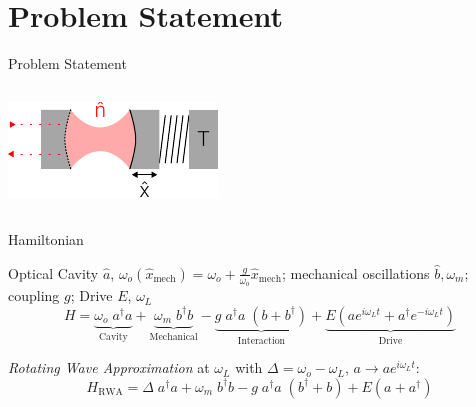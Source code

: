 \section{Problem Statement}
\begin{frame}{Problem Statement}
	\begin{columns}
		\includegraphics[width=\textwidth]{figures/drawing.pdf}

	\end{columns}

\end{frame}

\begin{frame}{Hamiltonian}

	{
		\small
		Optical Cavity $\hat a$, $\omega_o(\hat x_\text{mech}) = \omega_o + \frac{g}{\omega_o} \hat x_\text{mech}$;
		mechanical oscillations $\hat b, \omega_m$;
		coupling $g$;
		Drive $E$, $\omega_L$
	}
	$$
		H = \underbrace{
			\omega_o\; a^\dagger a
		}_\text{Cavity} 
		+ \underbrace{
			\omega_m\; b^\dagger b
		}_\text{Mechanical}
		- \underbrace{
			g\; a^\dagger a\; (b + b^\dagger)
		}_{\text{Interaction}}
		+ \underbrace{
			E ( a e^{i\omega_L t} + a^\dagger e^{-i\omega_L t} )
		}_{\text{Drive}}
	$$

	\emph{Rotating Wave Approximation} at $\omega_L$ with $\Delta = \omega_o - \omega_L$, $a \rightarrow ae^{i\omega_L t}$:
	$$
		H_\text{RWA} = \Delta\; a^\dagger a + \omega_m\; b^\dagger b - g\; a^\dagger a\; (b^\dagger + b) 
		+ E ( a + a^\dagger)
	$$

\end{frame}

